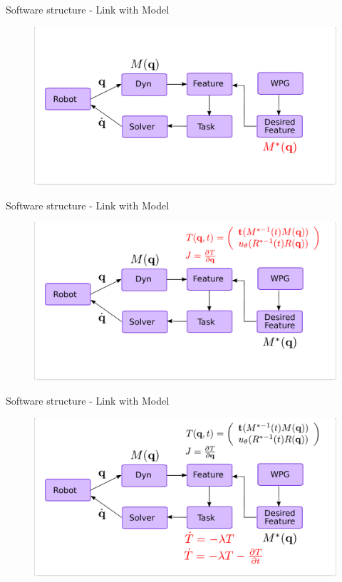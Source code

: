 \begin{frame}{Software structure - Link with Model}
  \begin{figure}
    \includegraphics[width=\linewidth]{./figures/Concept-Theory-Fig-Finalv2M3}
  \end{figure}
\end{frame}

\begin{frame}{Software structure - Link with Model}
  \begin{figure}
    \includegraphics[width=\linewidth]{./figures/Concept-Theory-Fig-Finalv2M2}
  \end{figure}
\end{frame}

\begin{frame}{Software structure - Link with Model}
  \begin{figure}
    \includegraphics[width=\linewidth]{./figures/Concept-Theory-Fig-Finalv2M1}
  \end{figure}
\end{frame}

